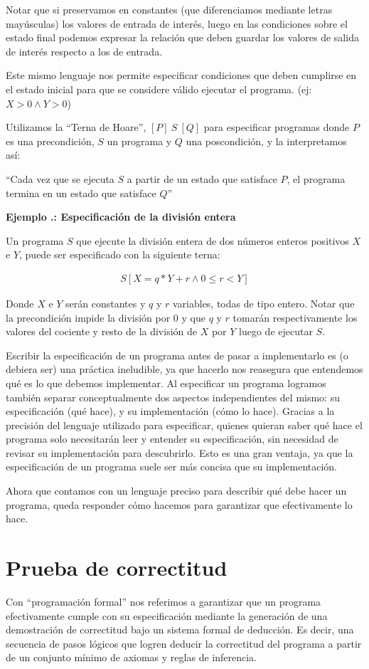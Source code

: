 \documentclass[12pt, a4paper, openany, fleqn]{book}
\newcounter{example}[chapter]
\renewcommand{\theexample}{\thechapter.\arabic{example}}
\newcommand{\example}[1]{
  \refstepcounter{example} %
  \vspace{1em}
  \noindent\textbf{Ejemplo \theexample: #1}
}
\newcommand{\hoare}[3]{\ensuremath{[#1]\ #2\ [#3]}}
\newcommand{\verticalHoare}[3]{
    \begin{align*}
        [#1]
        #2
        [#3]
    \end{align*}
}
\begin{document}
    Notar que si preservamos en constantes (que diferenciamos mediante letras mayúsculas) los valores de entrada de interés, luego en las condiciones sobre el estado final podemos expresar la relación que deben guardar los valores de salida de interés respecto a los de entrada.

    Este mismo lenguaje nos permite especificar condiciones que deben cumplirse en el estado inicial para que se considere válido ejecutar el programa. (ej: $X > 0 \land Y > 0$)

    Utilizamos la ``Terna de Hoare'', \hoare{P}{S}{Q} para especificar programas donde $P$ es una precondición, $S$ un programa y $Q$ una poscondición, y la interpretamos así:

    ``Cada vez que se ejecuta $S$ a partir de un estado que satisface $P$, el programa termina en un estado que satisface $Q$''

    \example{Especificación de la división entera}

    Un programa $S$ que ejecute la división entera de dos números enteros positivos $X$ e $Y$, puede ser especificado con la siguiente terna:
    \verticalHoare{X > 0 \land Y > 0}{S}{X = q * Y + r \land 0 \leqslant r < Y}
    Donde $X$ e $Y$ serán constantes y $q$ y $r$ variables, todas de tipo entero.
    Notar que la precondición impide la división por $0$ y que $q$ y $r$ tomarán respectivamente los valores del cociente y resto de la división de $X$ por $Y$ luego de ejecutar $S$.

    \vspace{1em}

    Escribir la especificación de un programa antes de pasar a implementarlo es (o debiera ser) una práctica ineludible, ya que hacerlo nos reasegura que entendemos qué es lo que debemos implementar.
    Al especificar un programa logramos también separar conceptualmente dos aspectos independientes del mismo: su especificación (qué hace), y su implementación (cómo lo hace).
    Gracias a la precisión del lenguaje utilizado para especificar, quienes quieran saber qué hace el programa solo necesitarán leer y entender su especificación, sin necesidad de revisar su implementación para descubrirlo. Esto es una gran ventaja, ya que la especificación de un programa suele ser más concisa que su implementación.

    Ahora que contamos con un lenguaje preciso para describir qué debe hacer un programa, queda responder cómo hacemos para garantizar que efectivamente lo hace.

    \section{Prueba de correctitud}
    Con ``programación formal'' nos referimos a garantizar que un programa efectivamente cumple con su especificación mediante la generación de una demostración de correctitud bajo un sistema formal de deducción. Es decir, una secuencia de pasos lógicos que logren deducir la correctitud del programa a partir de un conjunto mínimo de axiomas y reglas de inferencia.
\end{document}
